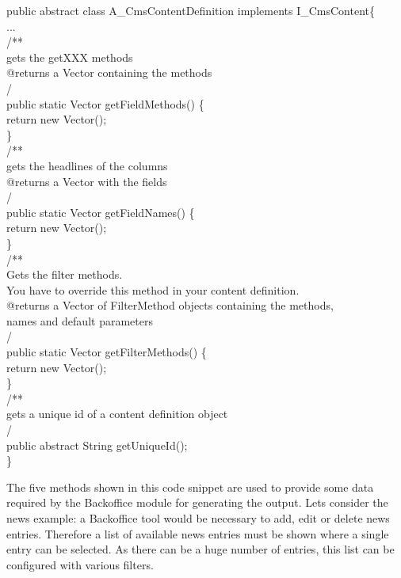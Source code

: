 \begin{java}
public abstract class A\_CmsContentDefinition implements I\_CmsContent\{\\
\jtaba ...\\[1ex]
\jtaba        /**\\
\jtaba \xspace * gets the getXXX methods\\
\jtaba \xspace * @returns a Vector containing the methods\\
\jtaba \xspace */\\
\jtaba public static Vector getFieldMethods() \{\\
\jtabb    return new Vector();\\
\jtaba \}\\[1ex]

\jtaba        /**\\
\jtaba \xspace * gets the headlines of the columns\\
\jtaba \xspace * @returns a Vector with the fields\\
\jtaba \xspace */\\
\jtaba public static Vector getFieldNames() \{\\
\jtabb return new Vector();\\
\jtaba \}\\[1ex]

\jtaba        /**\\
\jtaba \xspace * Gets the filter methods.\\
\jtaba \xspace * You have to override this method in your content definition.\\
\jtaba \xspace * @returns a Vector of FilterMethod objects containing the methods,\\
\jtaba \xspace * names and default parameters\\
\jtaba \xspace */\\
\jtaba public static Vector getFilterMethods() \{\\
\jtabb        return new Vector();\\
\jtaba  \}\\[1ex]

\jtaba        /**\\
\jtaba \xspace * gets a unique id of a content definition object\\
\jtaba \xspace */\\
\jtaba public abstract String getUniqueId();\\
\}
\end{java}

The five methods shown in this code snippet are used to provide some data required by
the Backoffice module for generating the output. Lets consider
the news example: a Backoffice tool would be necessary to add, edit or
delete news entries. Therefore a list of available news entries must be
shown where a single entry can be selected. As there can be a huge
number of entries, this list can be configured with various filters.


